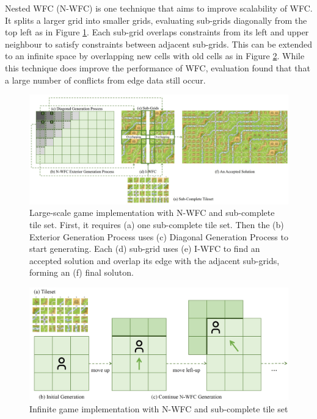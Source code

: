 Nested WFC (N-WFC) \cite{Nested_WFC} is one technique that aims to improve scalability of WFC. It splits a larger grid into smaller grids, evaluating sub-grids diagonally from the top left as in Figure \ref{fig:nestedWFC}. Each sub-grid overlaps constraints from its left and upper neighbour to satisfy constraints between adjacent sub-grids. This can be extended to an infinite space by overlapping new cells with old cells as in Figure \ref{fig:infiniteWFC}. While this technique does improve the performance of WFC, evaluation found that that a large number of conflicts from edge data still occur.

\begin{figure}[H]
    \centering
    \includegraphics[width=\textwidth, height=0.3\textheight, keepaspectratio]{Images/NestedWFC.jpg}
    \caption{Large-scale game implementation with N-WFC and sub-complete tile set. First, it requires (a) one sub-complete tile set. Then the (b) Exterior Generation Process uses (c) Diagonal Generation Process to start generating. Each (d) sub-grid uses (e) I-WFC to find an accepted solution and overlap its edge with the adjacent sub-grids, forming an (f) final soluton. \cite{Nested_WFC}}
    \label{fig:nestedWFC}
\end{figure}

\begin{figure}[H]
    \centering
    \includegraphics[width=\textwidth, height=0.3\textheight, keepaspectratio]{Images/InfiniteWFC.jpg}
    \caption{Infinite game implementation with N-WFC and sub-complete tile set \cite{Nested_WFC}}
    \label{fig:infiniteWFC}
\end{figure}

